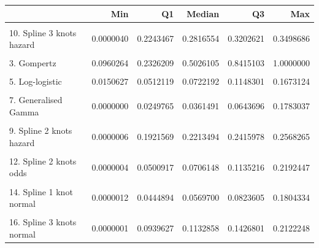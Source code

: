\documentclass[]{article}
\begin{document}
\begin{tabular}{lrrrrr}
\toprule
  & Min & Q1 & Median & Q3 & Max\\
\midrule
\cellcolor{gray!6}{1. Exponential} & \cellcolor{gray!6}{0.1278820} & \cellcolor{gray!6}{0.1278820} & \cellcolor{gray!6}{0.1278820} & \cellcolor{gray!6}{0.1278820} & \cellcolor{gray!6}{0.1278820}\\
10. Spline 3 knots hazard & 0.0000040 & 0.2243467 & 0.2816554 & 0.3202621 & 0.3498686\\
\cellcolor{gray!6}{2. Weibull} & \cellcolor{gray!6}{0.0298491} & \cellcolor{gray!6}{0.2382194} & \cellcolor{gray!6}{0.2998675} & \cellcolor{gray!6}{0.3413164} & \cellcolor{gray!6}{0.3730304}\\
3. Gompertz & 0.0960264 & 0.2326209 & 0.5026105 & 0.8415103 & 1.0000000\\
\cellcolor{gray!6}{4. Log-normal} & \cellcolor{gray!6}{0.0004751} & \cellcolor{gray!6}{0.0692201} & \cellcolor{gray!6}{0.0864990} & \cellcolor{gray!6}{0.1175437} & \cellcolor{gray!6}{0.1630482}\\
5. Log-logistic & 0.0150627 & 0.0512119 & 0.0722192 & 0.1148301 & 0.1673124\\
\cellcolor{gray!6}{6. Gamma} & \cellcolor{gray!6}{0.0159374} & \cellcolor{gray!6}{0.2105278} & \cellcolor{gray!6}{0.2273428} & \cellcolor{gray!6}{0.2338793} & \cellcolor{gray!6}{0.2373538}\\
7. Generalised Gamma & 0.0000000 & 0.0249765 & 0.0361491 & 0.0643696 & 0.1783037\\
\cellcolor{gray!6}{8. Spline 1 knot hazard} & \cellcolor{gray!6}{0.0005533} & \cellcolor{gray!6}{0.0961200} & \cellcolor{gray!6}{0.1007177} & \cellcolor{gray!6}{0.1087714} & \cellcolor{gray!6}{0.1767370}\\
9. Spline 2 knots hazard & 0.0000006 & 0.1921569 & 0.2213494 & 0.2415978 & 0.2568265\\
\cellcolor{gray!6}{11. Spline 1 knot odds} & \cellcolor{gray!6}{0.0004610} & \cellcolor{gray!6}{0.0331955} & \cellcolor{gray!6}{0.0461415} & \cellcolor{gray!6}{0.0743721} & \cellcolor{gray!6}{0.1809477}\\
12. Spline 2 knots odds & 0.0000004 & 0.0500917 & 0.0706148 & 0.1135216 & 0.2192447\\
\cellcolor{gray!6}{13. Spline 3 knots odds} & \cellcolor{gray!6}{0.0000052} & \cellcolor{gray!6}{0.0581364} & \cellcolor{gray!6}{0.0821832} & \cellcolor{gray!6}{0.1255993} & \cellcolor{gray!6}{0.2117141}\\
14. Spline 1 knot normal & 0.0000012 & 0.0444894 & 0.0569700 & 0.0823605 & 0.1804334\\
\cellcolor{gray!6}{15. Spline 2 knots normal} & \cellcolor{gray!6}{0.0000000} & \cellcolor{gray!6}{0.0682231} & \cellcolor{gray!6}{0.0852159} & \cellcolor{gray!6}{0.1164045} & \cellcolor{gray!6}{0.2005479}\\
16. Spline 3 knots normal & 0.0000001 & 0.0939627 & 0.1132858 & 0.1426801 & 0.2122248\\
\bottomrule
\end{tabular}
\end{document}
